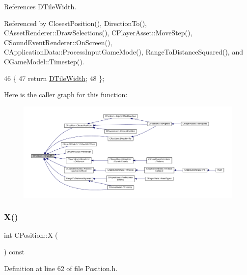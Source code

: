 References D\+Tile\+Width.



Referenced by Closest\+Position(), Direction\+To(), C\+Asset\+Renderer\+::\+Draw\+Selections(), C\+Player\+Asset\+::\+Move\+Step(), C\+Sound\+Event\+Renderer\+::\+On\+Screen(), C\+Application\+Data\+::\+Process\+Input\+Game\+Mode(), Range\+To\+Distance\+Squared(), and C\+Game\+Model\+::\+Timestep().


\begin{DoxyCode}
46                               \{
47             \textcolor{keywordflow}{return} \hyperlink{classCPosition_ac17d12fb5d35fcf62d63bb42e8cf7ed6}{DTileWidth};  
48         \};
\end{DoxyCode}
Here is the caller graph for this function\+:\nopagebreak
\begin{figure}[H]
\begin{center}
\leavevmode
\includegraphics[width=350pt]{classCPosition_a27a7a8b9a5541da0aa8d97d785650fb8_icgraph}
\end{center}
\end{figure}
\hypertarget{classCPosition_a9a6b94d3b91df1492d166d9964c865fc}{}\label{classCPosition_a9a6b94d3b91df1492d166d9964c865fc} 
\subsubsection{\texorpdfstring{X()}{X()}\hspace{0.1cm}{\footnotesize\ttfamily [1/2]}}
{\footnotesize\ttfamily int C\+Position\+::X (\begin{DoxyParamCaption}{ }\end{DoxyParamCaption}) const\hspace{0.3cm}{\ttfamily [inline]}}



Definition at line 62 of file Position.\+h.



